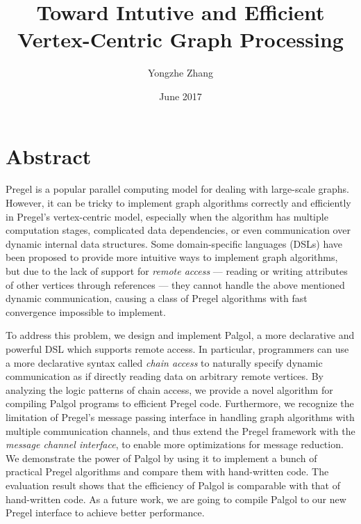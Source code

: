 \documentclass{sokendai_thesis} %
\title{Toward Intutive and Efficient Vertex-Centric Graph Processing}
\author{Yongzhe Zhang}
\date{June 2017}
\begin{document}
\frontmatter
\maketitle

\listoftodos

\chapter*{Abstract}

Pregel is a popular parallel computing model for dealing with large-scale graphs.
However, it can be tricky to implement graph algorithms correctly and efficiently in Pregel's vertex-centric model, especially when the algorithm has multiple computation stages, complicated data dependencies, or even communication over dynamic internal data structures.
Some domain-specific languages (DSLs) have been proposed to provide more intuitive ways to implement graph algorithms, but due to the lack of support for \emph{remote access} --- reading or writing attributes of other vertices through references --- they cannot handle the above mentioned dynamic communication, causing a class of Pregel algorithms with fast convergence impossible to implement.

To address this problem, we design and implement Palgol, a more declarative and powerful DSL which supports remote access.
In particular, programmers can use a more declarative syntax called \emph{chain access} to naturally specify dynamic communication as if directly reading data on arbitrary remote vertices.
By analyzing the logic patterns of chain access, we provide a novel algorithm for compiling Palgol programs to efficient Pregel code.
Furthermore, we recognize the limitation of Pregel's message passing interface in handling graph algorithms with multiple communication channels, and thus extend the Pregel framework with the \emph{message channel interface}, to enable more optimizations for message reduction.
We demonstrate the power of Palgol by using it to implement a bunch of practical Pregel algorithms and compare them with hand-written code.
The evaluation result shows that the efficiency of Palgol is comparable with that of hand-written code. %
As a future work, we are going to compile Palgol to our new Pregel interface to achieve better performance.

\tableofcontents
\end{document}
